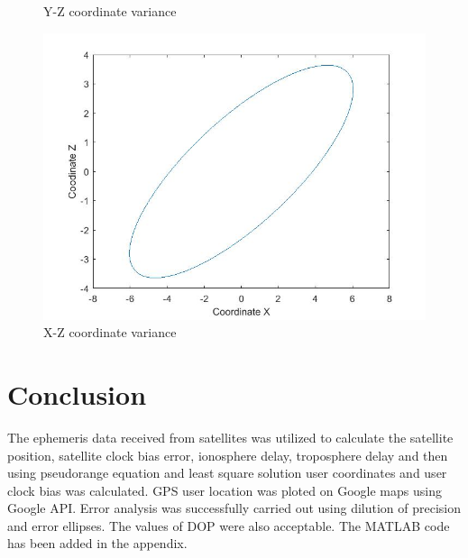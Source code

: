 \documentclass[conference,compsoc]{IEEEtran}
\begin{document}
\begin{enumerate}
\begin{figure}[!h]
	\caption{Y-Z coordinate variance}
\end{figure}
\begin{figure}[!h]
	\centering
	\includegraphics[scale = 0.15]{images/xz.jpg}
	\caption{X-Z coordinate variance}
\end{figure}
\end{enumerate}

\section{Conclusion}
The ephemeris data received from satellites was utilized to calculate the satellite position, satellite clock bias error, ionosphere delay, troposphere delay and then using pseudorange equation and least square solution user coordinates and user clock bias was calculated. GPS user location was ploted on Google maps using Google API. Error analysis was successfully carried out using dilution of precision and error ellipses. The values of DOP were also acceptable.
The MATLAB code has been added in the appendix.

\end{document}

